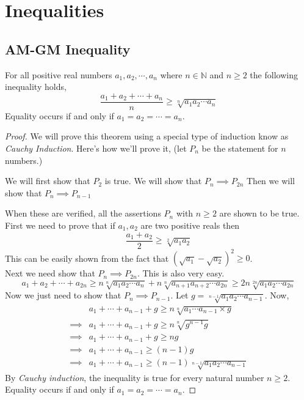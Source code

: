 \chapter{Inequalities}

\section{AM-GM Inequality}

\begin{theorem}[AM-GM Inequality]
    For all positive real numbers $a_{1}, a_{2}, \cdots, a_{n}$ where 
    $n \in \mathbb{N}$ and $n\geq 2$ the following inequality holds,
    \[
        \frac{a_{1} + a_{2} + \cdots + a_{n}}{n} \geq \sqrt[n]{a_{1}a_{2}\cdots a_{n}}
    \]
    Equality occurs if and only if $a_{1} = a_{2} = \cdots = a_{n}$.
\end{theorem}
\begin{proof}
    We will prove this theorem using a special type of induction know as 
    \emph{Cauchy Induction}. Here's how we'll prove it, 
    (let $P_{n}$ be the statement for $n$ numbers.)
    \begin{itemize}
        \ii We will first show that $P_{2}$ is true. 
        \ii We will show that $P_{n} \implies P_{2n}$
        \ii Then we will show that $P_{n} \implies P_{n-1}$
    \end{itemize}
    When these are verified, all the assertions $P_{n}$ with $n \geq 2$ are shown to be true. \\
    First we need to prove that if $a_{1}, a_{2}$ are two positive reals then 
    \[
        \frac{a_{1} + a_{2}}{2} \geq \sqrt[2]{a_{1} a_{2}}
    \]
    This can be easily shown from the fact that $(\sqrt{a_{1}} - \sqrt{a_{2}})^{2} \geq 0$. \\
    Next we need show that $P_{n} \implies P_{2n}$. This is also very easy.
    \[
    a_{1} + a_{2} + \cdots + a_{2n} 
    \geq n\sqrt[n]{a_{1}a_{2} \cdots a_{n}}+ n\sqrt[n]{a_{n+1}a_{n+2} \cdots a_{2n}} 
    \geq 2n\sqrt[2n]{a_{1}a_{2} \cdots a_{2n}}
    \]
    Now we just need to show that $P_{n} \implies P_{n-1}$. Let $g = \sqrt[n-1]{a_{1}a_{2} \cdots a_{n-1}}$. 
    Now,
    \begin{align*}
                 & a_{1} + \cdots + a_{n-1} + g \geq n\sqrt[n]{a_{1}\cdots a_{n-1} \times g} \\
        \implies & a_{1} + \cdots + a_{n-1} + g \geq n\sqrt[n]{g^{n-1}g} \\
        \implies & a_{1} + \cdots + a_{n-1} + g \geq ng \\
        \implies & a_{1} + \cdots + a_{n-1} \geq (n-1)g \\
        \implies & a_{1} + \cdots + a_{n-1} \geq (n-1)\sqrt[n-1]{a_{1}a_{2}\cdots a_{n-1}}
    \end{align*}
    By \emph{Cauchy induction}, the inequality is true for every natural number $n\geq 2$. 
    Equality occurs if and only if $a_{1} = a_{2} = \cdots = a_{n}$.
\end{proof}

